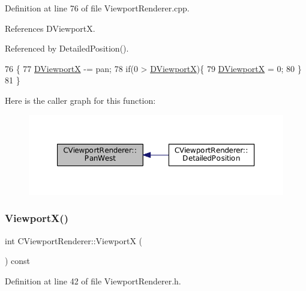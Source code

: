 Definition at line 76 of file Viewport\+Renderer.\+cpp.



References D\+ViewportX.



Referenced by Detailed\+Position().


\begin{DoxyCode}
76                                       \{
77     \hyperlink{classCViewportRenderer_aea9e05347f71a8e6b83439aab653be18}{DViewportX} -= pan;
78     \textcolor{keywordflow}{if}(0 > \hyperlink{classCViewportRenderer_aea9e05347f71a8e6b83439aab653be18}{DViewportX})\{
79         \hyperlink{classCViewportRenderer_aea9e05347f71a8e6b83439aab653be18}{DViewportX} = 0;
80     \}
81 \}
\end{DoxyCode}
Here is the caller graph for this function\+:\nopagebreak
\begin{figure}[H]
\begin{center}
\leavevmode
\includegraphics[width=350pt]{classCViewportRenderer_aa09c1b984311f77ea1cdcdc74a7a0316_icgraph}
\end{center}
\end{figure}
\hypertarget{classCViewportRenderer_adf6c09ee00cdbf0803e72d59bff9a235}{}\label{classCViewportRenderer_adf6c09ee00cdbf0803e72d59bff9a235} 
\subsubsection{\texorpdfstring{Viewport\+X()}{ViewportX()}\hspace{0.1cm}{\footnotesize\ttfamily [1/2]}}
{\footnotesize\ttfamily int C\+Viewport\+Renderer\+::\+ViewportX (\begin{DoxyParamCaption}{ }\end{DoxyParamCaption}) const\hspace{0.3cm}{\ttfamily [inline]}}



Definition at line 42 of file Viewport\+Renderer.\+h.



